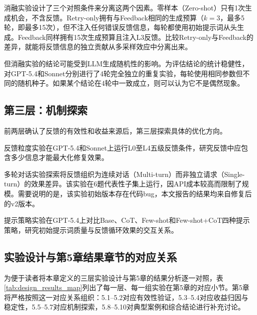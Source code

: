 消融实验设计了三个对照条件来分离这两个因素。零样本（Zero-shot）只有1次生成机会，不含反馈。Retry-only拥有与Feedback相同的生成预算（$k{=}3$，最多5轮，即最多15次），但不注入任何错误反馈信息，每轮都使用初始提示词从头生成。Feedback同样拥有15次生成预算且注入L3反馈。比较Retry-only与Feedback的差异，就能将反馈信息的独立贡献从多采样效应中分离出来。

但消融实验的结论可能受到LLM生成随机性的影响。为评估结论的统计稳健性，对GPT-5.4和Sonnet分别进行了4轮完全独立的重复实验，每轮使用相同参数但不同的随机种子。如果某个结论在4轮中一致成立，则可以认为它不是偶然现象。

\subsection{第三层：机制探索}

前两层确认了反馈的有效性和收益来源后，第三层探索具体的优化方向。

反馈粒度实验在GPT-5.4和Sonnet上运行L0至L4五级反馈条件，研究反馈中应包含多少信息才能最大化修复效果。

多轮对话实验探索将反馈组织为连续对话（Multi-turn）而非独立请求（Single-turn）的效果差异。该实验在6题代表性子集上运行，因API成本较高而限制了规模。需要说明的是，该实验初始版本存在代码bug，本文报告的结果均来自修复后的v2版本。

提示策略实验在GPT-5.4上对比Base、CoT\cite{cot}、Few-shot和Few-shot+CoT\cite{gpt3}四种提示策略，研究初始提示词质量与反馈循环效果的交互关系。

\subsection{实验设计与第5章结果章节的对应关系}

为便于读者将本章定义的三层实验设计与第5章的结果分析逐一对照，表\ref{tab:design_results_map}列出了每一层、每一组实验在第5章的对应小节。第5章将严格按照这一对应关系组织：5.1--5.2对应有效性验证，5.3--5.4对应收益归因与稳定性，5.5--5.7对应机制探索，5.8--5.10对典型案例和综合结论进行补充讨论。

